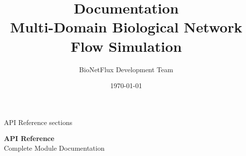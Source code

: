 \documentclass[11pt,a4paper]{article}
\title{\Huge {\textbf{\bionetflux{} Documentation}} \\[0.5cm]
       \Large Multi-Domain Biological Network Flow Simulation}
\author{BioNetFlux Development Team}
\date{\today}
\begin{document}




\tableofcontents
\clearpage






%
%
%
%




 API Reference sections

\clearpage
\setcounter{page}{1}
\renewcommand{\thepage}{A.\arabic{page}}


\clearpage
\thispagestyle{empty}
\vspace*{\fill}
\begin{center}
	{\Huge \textbf{API Reference}}\\[1cm]
	{\Large Complete Module Documentation}\\[2cm]
\end{center}
\vspace*{\fill}
\clearpage

\setcounter{page}{1}
\renewcommand{\thepage}{A.\arabic{page}}
 
 \newpage
 \setcounter{page}{1}
\renewcommand{\thepage}{B.\arabic{page}}

\newpage
 \setcounter{page}{1}
\renewcommand{\thepage}{C.\arabic{page}}

\newpage
 \setcounter{page}{1}
\renewcommand{\thepage}{D.\arabic{page}}

\newpage
 \setcounter{page}{1}
\renewcommand{\thepage}{E.\arabic{page}}

\newpage
 \setcounter{page}{1}
\renewcommand{\thepage}{F.\arabic{page}}

\newpage
 \setcounter{page}{1}
\renewcommand{\thepage}{G.\arabic{page}}

\newpage
 \setcounter{page}{1}
\renewcommand{\thepage}{H.\arabic{page}}

\newpage
 \setcounter{page}{1}
\renewcommand{\thepage}{I.\arabic{page}}

\newpage
 \setcounter{page}{1}
\renewcommand{\thepage}{J.\arabic{page}}

\newpage
 \setcounter{page}{1}
\renewcommand{\thepage}{K.\arabic{page}}

\newpage
 \setcounter{page}{1}
\renewcommand{\thepage}{L.\arabic{page}}

\newpage
 \setcounter{page}{1}
\renewcommand{\thepage}{M.\arabic{page}}

\newpage
 \setcounter{page}{1}
\renewcommand{\thepage}{N.\arabic{page}}

\newpage
 \setcounter{page}{1}
\renewcommand{\thepage}{O.\arabic{page}}

\newpage
 \setcounter{page}{1}
\renewcommand{\thepage}{P.\arabic{page}}


%
%
%
%
\end{document}
